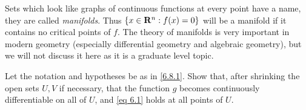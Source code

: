 \begin{remark}\label{6.8.4}
  Sets which look like graphs of continuous functions at every point have a name, they are called \emph{manifolds}.
  Thus \(\{x \in \mathbf{R}^n : f(x) = 0\}\) will be a manifold if it contains no critical points of \(f\).
  The theory of manifolds is very important in modern geometry (especially differential geometry and algebraic geometry), but we will not discuss it here as it is a graduate level topic.
\end{remark}

\exercisesection

\begin{exercise}\label{ex 6.8.1}
  Let the notation and hypotheses be as in \cref{6.8.1}.
  Show that, after shrinking the open sets \(U, V\) if necessary, that the function \(g\) becomes continuously differentiable on all of \(U\), and \cref{eq 6.1} holds at all points of \(U\).
\end{exercise}